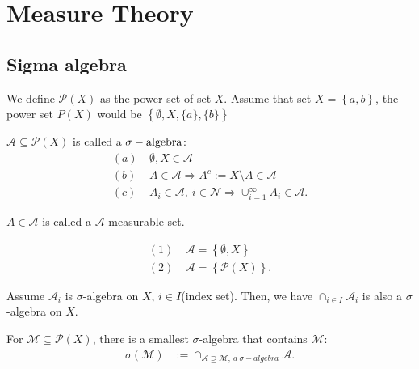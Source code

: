 \documentclass[../../note.tex]{subfiles}
\begin{document}
\chapter{Measure Theory}
\section{Sigma algebra}
\begin{definition}
    \label{def: power set}
    We define $\mathcal{P}(X)$ as the power set of set $X$. Assume that set $X = \left\{a,b\right\}$, the power set $P(X)$ would be $\left\{\emptyset, X, \{a\}, \{b\}\right\}$
\end{definition}
\begin{definition}
    $\mathcal{A} \subseteq \mathcal{P}(X)$ is called a $\sigma-{\rm algebra}$:
    \begin{align}
        (a)~& \emptyset, X \in \mathcal{A} \\
        (b)~& A \in \mathcal{A} \Longrightarrow A^c:= X \text{\textbackslash} A \in \mathcal{A} \\
        (c)~& A_i \in \mathcal{A},~i \in \mathcal{N}\Longrightarrow \cup_{i=1}^{\infty} A_i \in \mathcal{A}.
    \end{align}
\end{definition}

\begin{definition}
    $A \in \mathcal{A}$ is called a $\mathcal{A}$-measurable set.
\end{definition}

\begin{example}
    \begin{align}
        (1)~&\mathcal{A} = \left\{\emptyset, X \right\} \\
        (2)~&\mathcal{A} = \left\{\mathcal{P}(X)\right\}.
    \end{align}
\end{example}

\begin{lemma}
    Assume $\mathcal{A}_i$ is $\sigma$-algebra on $X$, $i\in I$(index set). Then, we have $\cap_{i \in I} \mathcal{A}_i$ is also a $\sigma$-algebra on $X$.
\end{lemma}

\begin{definition}
    For $\mathcal{M} \subseteq \mathcal{P}(X)$, there is a smallest $\sigma$-algebra that contains $\mathcal{M}$:
    \begin{align}
        \sigma(\mathcal{M})
        &:= \cap_{\mathcal{A}\supseteq \mathcal{M},~a~\sigma-algebra} \mathcal{A}.
    \end{align}
\end{definition}
\end{document}
